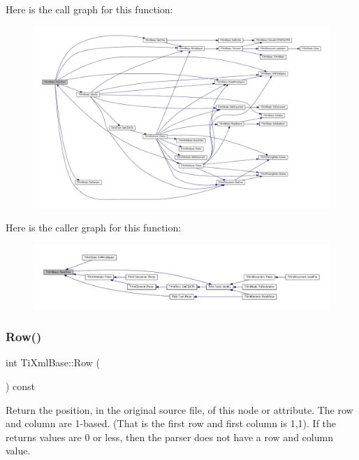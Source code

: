 Here is the call graph for this function\+:
\nopagebreak
\begin{figure}[H]
\begin{center}
\leavevmode
\includegraphics[width=350pt]{class_ti_xml_base_aa646c74921aa33156968b802bbf5566e_cgraph}
\end{center}
\end{figure}
Here is the caller graph for this function\+:
\nopagebreak
\begin{figure}[H]
\begin{center}
\leavevmode
\includegraphics[width=350pt]{class_ti_xml_base_aa646c74921aa33156968b802bbf5566e_icgraph}
\end{center}
\end{figure}
\mbox{\label{class_ti_xml_base_ad0cacca5d76d156b26511f46080b442e}} 
\subsubsection{\texorpdfstring{Row()}{Row()}}
{\footnotesize\ttfamily int Ti\+Xml\+Base\+::\+Row (\begin{DoxyParamCaption}{ }\end{DoxyParamCaption}) const\hspace{0.3cm}{\ttfamily [inline]}}

Return the position, in the original source file, of this node or attribute. The row and column are 1-\/based. (That is the first row and first column is 1,1). If the returns values are 0 or less, then the parser does not have a row and column value.

